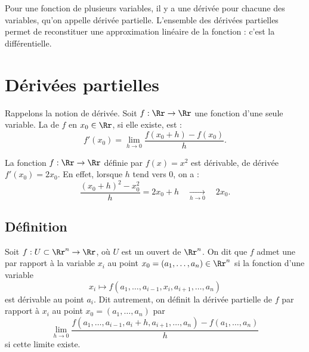 \documentclass[11pt, class=report,crop=false]{standalone}
\begin{document}

\newcommand{\grad}{\operatorname{grad}} %


Pour une fonction de plusieurs variables, il y a une dérivée pour chacune des variables, qu'on appelle dérivée partielle. L'ensemble des dérivées partielles permet de reconstituer une approximation linéaire de la fonction : c'est la différentielle.




\section{Dérivées partielles}

Rappelons la notion de dérivée.
Soit $f : \Rr \to \Rr$ une fonction d'une seule variable.
La  de $f$ en $x_0 \in \Rr$, si elle existe, est : 
$$f'(x_0) = \lim_{h \to 0} \frac{f(x_0 + h) - f(x_0)}{h}.$$

\begin{exemple}
La fonction $f : \Rr \to \Rr$ définie par $f(x)=x^2$ est dérivable, de dérivée $f'(x_0)=2x_0$. En effet, lorsque $h$ tend vers $0$, on a :
$$\frac{(x_0+h)^2-x_0^2}{h}=2x_0+h \quad \underset{h\to 0}{\longrightarrow} \quad 2x_0.$$
\end{exemple}



\subsection{Définition}

\begin{definition}
Soit $f : U \subset \Rr^n \to \Rr$, où $U$ est un ouvert de $\Rr^n$. 
On dit que $f$ admet une  par rapport à la variable $x_i$ au point $x_0=(a_1,\dots, a_n) \in \Rr^n$ si la fonction d'une variable
$$x_i \mapsto f(a_1,\dots,a_{i-1},x_i, a_{i+1},\ldots,a_n)$$
est dérivable au point $a_i$. Dit autrement, on définit la dérivée partielle de $f$ par rapport à $x_i$ au point $x_0=(a_1,\ldots, a_n)$ par  
$$
\lim_{h \rightarrow 0} 
\frac{f(a_1, \ldots, a_{i-1} , a_i + h, a_{i+1} , \dots , a_n) - f(a_1,\ldots, a_n)}{h}
$$ 
si cette limite existe.
\end{definition}
\end{document}
